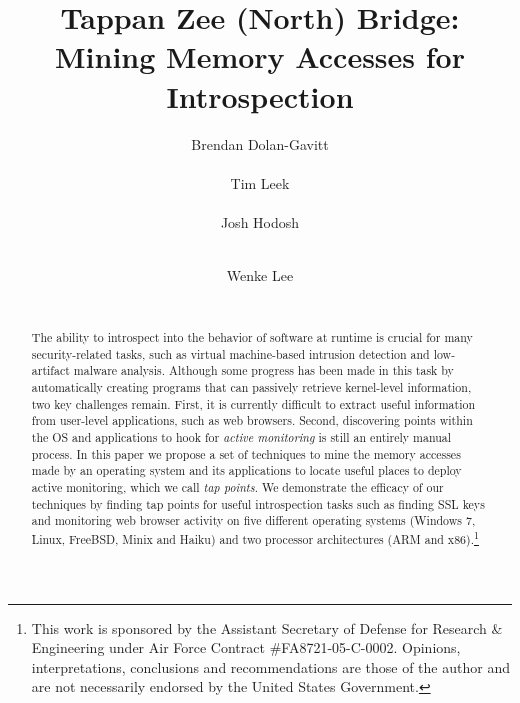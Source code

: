 \documentclass{sig-alternate-2013}
\begin{document}
\date{}

\title{Tappan Zee (North) Bridge: Mining Memory Accesses for Introspection}


\author{
\alignauthor
Brendan Dolan-Gavitt\\
    \\
\alignauthor
Tim Leek\\
    \\
\alignauthor
Josh Hodosh\\
    \\
\and
\alignauthor
Wenke Lee\\
    \\
} %

\maketitle

\thispagestyle{empty}

\begin{abstract}

The ability to introspect into the behavior of software at runtime is
crucial for many security-related tasks, such as virtual machine-based
intrusion detection and low-artifact malware analysis. Although some
progress has been made in this task by automatically creating programs
that can passively retrieve kernel-level information, two key challenges
remain. First, it is currently difficult to extract useful information
from user-level applications, such as web browsers. Second, discovering
points within the OS and applications to hook for \emph{active
monitoring} is still an entirely manual process. In this paper we
propose a set of techniques to mine the memory accesses made by an
operating system and its applications to locate useful places to deploy
active monitoring, which we call \emph{tap points}. We demonstrate the
efficacy of our techniques by finding tap points for useful
introspection tasks such as finding SSL keys and monitoring web browser
activity on five different operating systems (Windows 7, Linux, FreeBSD,
Minix and Haiku) and two processor architectures (ARM and x86).\footnote{This
work is sponsored by the Assistant Secretary of Defense for Research \&
Engineering under Air Force Contract \#FA8721-05-C-0002. Opinions,
interpretations, conclusions and recommendations are those of the author and
are not necessarily endorsed by the United States Government.}

\end{abstract}
\end{document}
